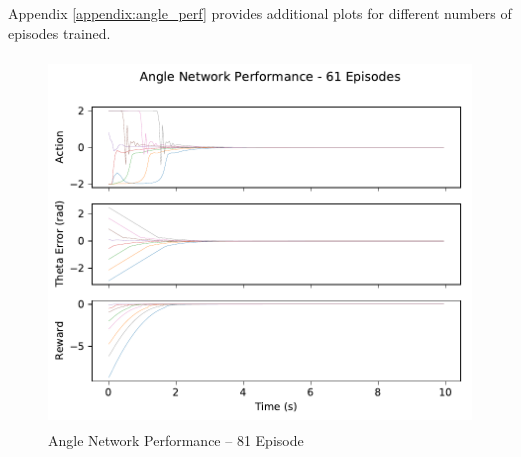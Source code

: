 Appendix \ref{appendix:angle_perf} provides additional plots for different numbers of episodes trained. 
\begin{figure}[H]
	\centering
	\includegraphics[width=6in, height=3.85in, keepaspectratio]{figures/train_figs/angle_transitions/0_61.pdf}
	\caption{Angle Network Performance -- 81 Episode}\label{fig:angle_perf61}
\end{figure}

